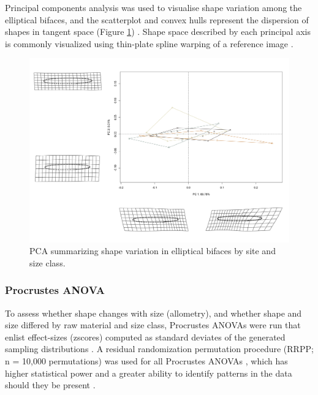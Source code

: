 \documentclass[]{interact}
\theoremstyle{plain}%
\theoremstyle{definition}
\theoremstyle{remark}
\begin{document}
Principal components analysis \citep{RN1746} was used to visualise shape
variation among the elliptical bifaces, and the scatterplot and convex
hulls represent the dispersion of shapes in tangent space (Figure
\ref{fig:pca}) \citep{RN8633,RN5616,RN11143,RN7550}. Shape space
described by each principal axis is commonly visualized using thin-plate
spline warping of a reference image \citep{RN1731,RN479}.

\begin{figure}\centering
\includegraphics[width=\linewidth]{figs/pca.png}
\caption{PCA summarizing shape variation in elliptical bifaces by site and size class. }
\label{fig:pca}
\end{figure}

\hypertarget{procrustes-anova}{%
\subsubsection{Procrustes ANOVA}\label{procrustes-anova}}

To assess whether shape changes with size (allometry), and whether shape
and size differed by raw material and size class, Procrustes ANOVAs
\citep{RN1749} were run that enlist effect-sizes (zscores) computed as
standard deviates of the generated sampling distributions
\citep{RN1756}. A residual randomization permutation procedure (RRPP; n
= 10,000 permutations) was used for all Procrustes ANOVAs
\citep{RN1655,RN11775}, which has higher statistical power and a greater
ability to identify patterns in the data should they be present
\citep{RN1719}.
\end{document}
